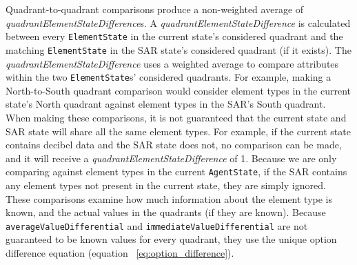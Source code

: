 Quadrant-to-quadrant comparisons produce a non-weighted average of \textit{quadrantElementStateDifference}s.
A \textit{quadrantElementStateDifference} is calculated between every \texttt{ElementState} in the current state's considered quadrant and the matching \texttt{ElementState} in the SAR state's considered quadrant (if it exists).
The \textit{quadrantElementStateDifference} uses a weighted average to compare attributes within the two \texttt{ElementState}s' considered quadrants.
For example, making a North-to-South quadrant comparison would consider element types in the current state's North quadrant against element types in the SAR's South quadrant.
When making these comparisons, it is not guaranteed that the current state and SAR state will share all the same element types.
For example, if the current state contains decibel data and the SAR state does not, no comparison can be made, and it will receive a \textit{quadrantElementStateDifference} of 1.
Because we are only comparing against element types in the current \texttt{AgentState}, if the SAR contains any element types not present in the current state, they are simply ignored.
These comparisons examine how much information about the element type is known, and the actual values in the quadrants (if they are known).
Because \texttt{averageValueDifferential} and \texttt{immediateValueDifferential} are not guaranteed to be known values for every quadrant, they use the unique option difference equation (equation ~\ref{eq:option_difference}).


